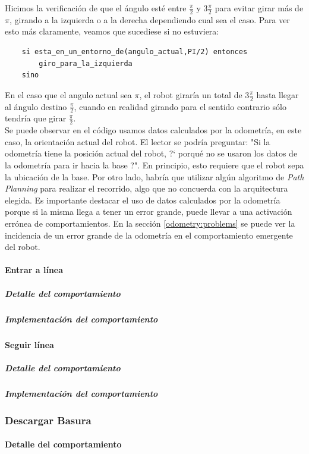 Hicimos la verificaci\'on de que el \'angulo est\'e entre $\frac{\pi}{2}$ y $3\frac{\pi}{2}$
para evitar girar m\'as de $\pi$, girando a la izquierda o a la derecha dependiendo
cual sea el caso. Para ver esto m\'as claramente, veamos que sucediese si no estuviera:
\begin{verbatim}
    si esta_en_un_entorno_de(angulo_actual,PI/2) entonces
        giro_para_la_izquierda
    sino
\end{verbatim}
En el caso que el angulo actual sea $\pi$, el robot girar\'ia un total de $3\frac{\pi}{2}$
hasta llegar al \'angulo destino $\frac{\pi}{2}$, cuando en realidad girando para el sentido
contrario s\'olo tendr\'ia que girar $\frac{\pi}{2}$.
\\
Se puede observar en el c\'odigo usamos datos calculados por la odometr\'ia, en
este caso, la orientaci\'on actual del robot. El lector se podr\'ia preguntar:
"Si la odometr\'ia tiene la posici\'on actual del robot, ?` porqu\'e no se usaron los datos
de la odometr\'ia para ir hacia la base ?". En principio, esto requiere que el robot sepa
la ubicaci\'on de la base. Por otro lado, habr\'ia que utilizar alg\'un algoritmo de
\emph{Path Planning} para realizar el recorrido, algo que no concuerda con la arquitectura
elegida.
Es importante destacar el uso de datos calculados por la odometr\'ia porque si la misma
llega a tener un error grande, puede llevar a una activaci\'on err\'onea de comportamientos.
En la secci\'on \ref{odometry:problems} se puede ver la incidencia de un error grande de
la odometr\'ia en el comportamiento emergente del robot.

\paragraph{Entrar a l\'inea}
\label{enter_line}
\subparagraph{Detalle del comportamiento}
\subparagraph{Implementaci\'on del comportamiento}

\paragraph{Seguir l\'inea}
\label{follow_line}
\subparagraph{Detalle del comportamiento}
\subparagraph{Implementaci\'on del comportamiento}

\subsubsection{Descargar Basura}
\label{unload_garbage}
\paragraph{Detalle del comportamiento}
